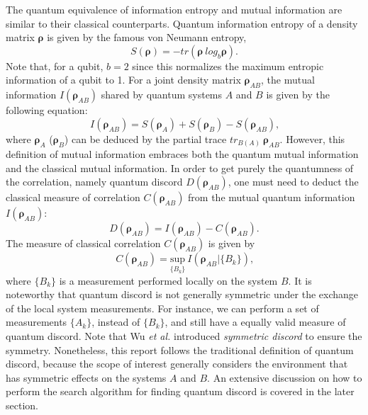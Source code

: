 \documentclass[%
 reprint,
 amsmath,amssymb,
 aps,
]{revtex4-1}
\begin{document}
The quantum equivalence of information entropy and mutual information are similar to their classical counterparts. Quantum information entropy of a density matrix $\boldsymbol{\rho}$ is given by the famous von Neumann entropy, 
\begin{equation}
S(\boldsymbol{\rho}) = -tr(\boldsymbol{\rho} \  log_b \boldsymbol{\rho}) \text{.}
\end{equation}
\noindent Note that, for a qubit, $b=2$ since this normalizes the maximum entropic information of a qubit to 1. For a joint density matrix $\boldsymbol{\rho}_{AB}$, the mutual information $\textit{I}(\boldsymbol{\rho}_{AB})$ shared by quantum systems $A$ and $B$ is given by the following equation:
\begin{equation}
\textit{I}(\boldsymbol{\rho}_{AB}) = S(\boldsymbol{\rho}_A) + S(\boldsymbol{\rho}_B) - S(\boldsymbol{\rho}_{AB}) \label{quan.cor.} \text{,}
\end{equation}
\noindent where $\boldsymbol{\rho}_A$ ($\boldsymbol{\rho}_B$) can be deduced by the partial trace $tr_{B(A)} \  \boldsymbol{\rho}_{AB}$. However, this definition of mutual information embraces both the quantum mutual information and the classical mutual information. In order to get purely the quantumness of the correlation, namely quantum discord $\textit{D}(\boldsymbol{\rho}_{AB})$, one must need to deduct the classical measure of correlation $\textit{C}(\boldsymbol{\rho}_{AB})$ from the mutual quantum information $\textit{I}(\boldsymbol{\rho}_{AB})$:
\begin{equation}
\textit{D}(\boldsymbol{\rho}_{AB}) = \textit{I}(\boldsymbol{\rho}_{AB}) - \textit{C}(\boldsymbol{\rho}_{AB}) \text{.}
\end{equation}
\noindent The measure of classical correlation $\textit{C}(\boldsymbol{\rho}_{AB})$ is given by
\begin{equation}
\textit{C}(\boldsymbol{\rho}_{AB}) = \underset{\{B_k\}}{\text{sup}}\ \textit{I}(\boldsymbol{\rho}_{AB}|\{B_k\}) \label{clas.cor.} \text{,}
\end{equation}
\noindent where $\{B_k\}$ is a measurement performed locally on the system $B$. It is noteworthy that quantum discord is not generally symmetric under the exchange of the local system measurements. For instance, we can perform a set of measurements $\{A_k\}$, instead of $\{B_k\}$, and still have a equally valid measure of quantum discord. Note that Wu \textit{et al.} introduced \textit{symmetric discord} to ensure the symmetry. Nonetheless, this report follows the traditional definition of quantum discord, because the scope of interest generally considers the environment that has symmetric effects on the systems $A$ and $B$. An extensive discussion on how to perform the search algorithm for finding quantum discord is covered in the later section.
\end{document}
